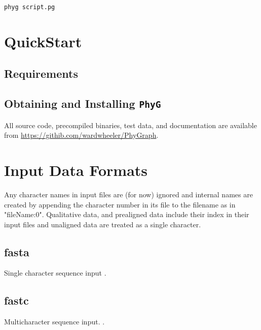 \documentclass[11pt]{article}
\begin{document}
	\bigskip
	\texttt{phyg script.pg}
	
	
	\section{QuickStart}
		\subsection{Requirements}
		\subsection{Obtaining and Installing \texttt{PhyG}}
			All source code, precompiled binaries, test data, and documentation are available from \url{https://githib.com/wardwheeler/PhyGraph}.

	\section{Input Data Formats}
		Any character names in input files are (for now) ignored and internal names are created
		by appending the character number in its file to the filename as in "fileName:0".
		Qualitative data, and prealigned data include their index in their input files and unaligned 
		data are treated as a single character.
		\subsection{fasta}
			Single character sequence input \citep{PearsonandLipman1988}.
		\subsection{fastc}
			Multicharacter sequence input.  \citep{WheelerandWashburn2019}.
\end{document}

